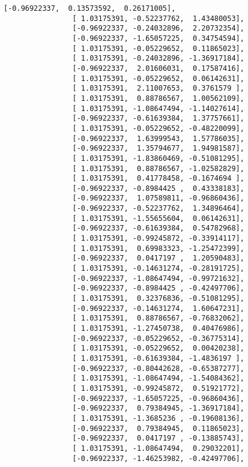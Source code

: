 \documentclass[11pt]{article}
\begin{document}
\begin{Verbatim}[commandchars=\\\{\}]
                [-0.96922337,  0.13573592,  0.26171005],
                [ 1.03175391, -0.52237762,  1.43480053],
                [-0.96922337, -0.24032896,  2.20732354],
                [-0.96922337, -1.65057225,  0.34754594],
                [ 1.03175391, -0.05229652,  0.11865023],
                [ 1.03175391, -0.24032896, -1.36917184],
                [-0.96922337,  2.01606031,  0.17587416],
                [ 1.03175391, -0.05229652,  0.06142631],
                [ 1.03175391,  2.11007653,  0.3761579 ],
                [ 1.03175391,  0.88786567,  1.00562109],
                [ 1.03175391, -1.08647494, -1.14027614],
                [-0.96922337, -0.61639384,  1.37757661],
                [ 1.03175391, -0.05229652, -0.48220099],
                [-0.96922337,  1.63999543,  1.57786035],
                [-0.96922337,  1.35794677,  1.94981587],
                [ 1.03175391, -1.83860469, -0.51081295],
                [ 1.03175391,  0.88786567, -1.02582829],
                [ 1.03175391,  0.41778458, -0.1674694 ],
                [-0.96922337, -0.8984425 ,  0.43338183],
                [-0.96922337,  1.07589811, -0.96860436],
                [-0.96922337, -0.52237762,  1.34896464],
                [ 1.03175391, -1.55655604,  0.06142631],
                [-0.96922337, -0.61639384,  0.54782968],
                [ 1.03175391, -0.99245872, -0.33914117],
                [ 1.03175391,  0.69983323, -1.25472399],
                [-0.96922337,  0.0417197 ,  1.20590483],
                [ 1.03175391, -0.14631274, -0.28191725],
                [-0.96922337, -1.08647494, -0.99721632],
                [-0.96922337, -0.8984425 , -0.42497706],
                [ 1.03175391,  0.32376836, -0.51081295],
                [-0.96922337, -0.14631274,  1.60647231],
                [ 1.03175391,  0.88786567, -0.76832062],
                [ 1.03175391, -1.27450738,  0.40476986],
                [-0.96922337, -0.05229652, -0.36775314],
                [ 1.03175391, -0.05229652,  0.00420238],
                [ 1.03175391, -0.61639384, -1.4836197 ],
                [-0.96922337, -0.80442628, -0.65387277],
                [ 1.03175391, -1.08647494, -1.54084362],
                [ 1.03175391, -0.99245872,  0.51921772],
                [-0.96922337, -1.65057225, -0.96860436],
                [-0.96922337,  0.79384945, -1.36917184],
                [ 1.03175391, -1.3685236 , -0.19608136],
                [-0.96922337,  0.79384945,  0.11865023],
                [-0.96922337,  0.0417197 , -0.13885743],
                [ 1.03175391, -1.08647494,  0.29032201],
                [-0.96922337, -1.46253982, -0.42497706],

\end{Verbatim}
\end{document}
